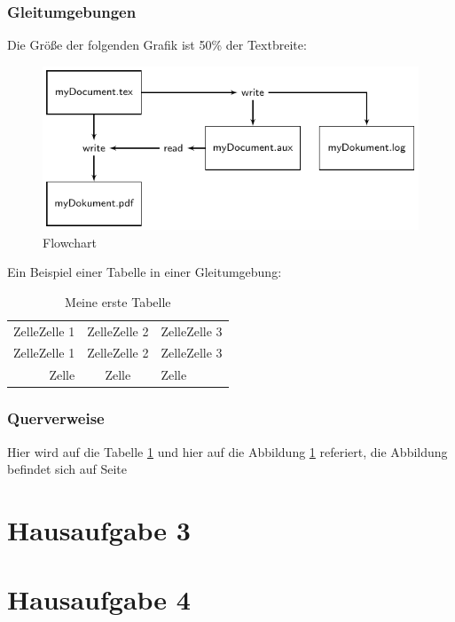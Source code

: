 \documentclass[10pt,paper=a4,abstracton]{scrartcl}
\begin{document}
\subsubsection{Gleitumgebungen}

Die Größe der folgenden Grafik ist 50\% der Textbreite:

\begin{figure}[htbp]
	\centering
	\includegraphics[width=.5\linewidth]{LaTeX-flowchart-1}
	\caption{Flowchart}
	\label{fig:flowchart}
\end{figure}


\blindtext


Ein Beispiel einer Tabelle in einer Gleitumgebung: 

\begin{table}[htbp]
\centering	
\caption{Meine erste Tabelle}
\begin{tabular}[t]{rc|l|}
	ZelleZelle 1 & ZelleZelle 2 & ZelleZelle 3 \\
	ZelleZelle 1 & ZelleZelle 2 & ZelleZelle 3 \\
	\hline
	Zelle & Zelle & Zelle \\
\end{tabular}
\label{fig:Tabelle1}
\end{table}


\subsubsection{Querverweise}

Hier wird auf die Tabelle \ref{fig:Tabelle1} und hier auf die Abbildung \ref{fig:flowchart} referiert, die Abbildung befindet sich auf Seite \pageref{fig:flowchart}


\section{Hausaufgabe 3}


\section{Hausaufgabe 4}




\end{document}
